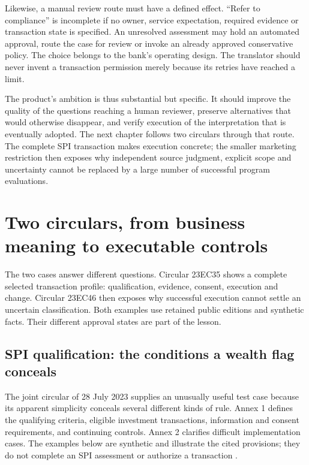 \documentclass[12pt,a4paper,oneside,openany]{book}
\begin{document}
Likewise, a manual review route must have a defined effect. ``Refer to compliance''
is incomplete if no owner, service expectation, required evidence or transaction
state is specified. An unresolved assessment may hold an automated approval,
route the case for review or invoke an already approved conservative policy. The
choice belongs to the bank's operating design. The translator should never
invent a transaction permission merely because its retries have reached a limit.

The product's ambition is thus substantial but specific. It should improve the
quality of the questions reaching a human reviewer, preserve alternatives that
would otherwise disappear, and verify execution of the interpretation that is
eventually adopted. The next chapter follows two circulars through that route. The complete
SPI transaction makes execution concrete; the smaller marketing restriction
then exposes why independent source judgment, explicit scope and uncertainty
cannot be replaced by a large number of successful program evaluations.


\chapter{Two circulars, from business meaning to executable controls}
\label{ch:circular}


The two cases answer different questions. Circular 23EC35 shows a complete
selected transaction profile: qualification, evidence, consent, execution and
change. Circular 23EC46 then exposes why successful execution cannot settle an
uncertain classification. Both examples use retained public editions and
synthetic facts. Their different approval states are part of the lesson.

\section{SPI qualification: the conditions a wealth flag conceals}
\label{merge:P-01-problem:02}

\label{sec:spi}

The joint circular of 28 July 2023 supplies an unusually useful test case because
its apparent simplicity conceals several different kinds of rule. Annex 1
defines the qualifying criteria, eligible investment transactions, information
and consent requirements, and continuing controls. Annex 2 clarifies difficult
implementation cases. The examples below are synthetic and illustrate the cited
provisions; they do not complete an SPI assessment or authorize a transaction
\citep{sfcspi,sfcspiannex1,sfcspiannex2}.
\end{document}
